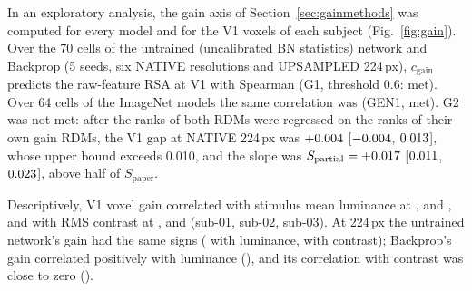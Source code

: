 In an exploratory analysis, the gain axis of Section~\ref{sec:gainmethods} was computed for every model
and for the V1 voxels of each subject (Fig.~\ref{fig:gain}). Over the 70 cells of the
untrained (uncalibrated BN statistics) network and Backprop (5 seeds, six NATIVE
resolutions and UPSAMPLED 224\,px), $c_{\mathrm{gain}}$ predicts the raw-feature RSA at
V1 with Spearman \GOneSpearman{} (G1, threshold 0.6: met). Over 64 cells of the ImageNet
models the same correlation was \GenOneSpearman{} (GEN1, met). G2 was not met: after the
ranks of both RDMs were regressed on the ranks of their own gain RDMs, the V1 gap at
NATIVE 224\,px was $+0.004$ [$-0.004$, $0.013$], whose
upper bound exceeds 0.010, and the slope was $S_{\mathrm{partial}} = +0.017$
[$0.011$, $0.023$], above half of $S_{\mathrm{paper}}$.

Descriptively, V1 voxel gain correlated with stimulus mean luminance at
\VoxGainLumSubOne, \VoxGainLumSubTwo{} and \VoxGainLumSubThree, and with RMS contrast at
\VoxGainConSubOne, \VoxGainConSubTwo{} and \VoxGainConSubThree{} (sub-01, sub-02,
sub-03). At 224\,px the untrained network's gain had the same signs
(\ModelGainRandLum{} with luminance, \ModelGainRandCon{} with contrast); Backprop's gain
correlated positively with luminance (\ModelGainBpLum), and its correlation with contrast
was close to zero (\ModelGainBpCon).
